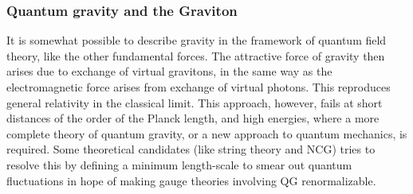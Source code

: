 \subsubsection{Quantum gravity and the Graviton}
It is somewhat possible to describe gravity in the framework of quantum field theory, like the other fundamental forces. The attractive force of gravity then arises due to exchange of virtual gravitons, in the same way as the electromagnetic force arises from exchange of virtual photons. This reproduces general relativity in the classical limit. This approach, however, fails at short distances of the order of the Planck length, and high energies, where a more complete theory of quantum gravity, or a new approach to quantum mechanics, is required. Some theoretical candidates (like string theory and NCG) tries to resolve this by defining a minimum length-scale to smear out quantum fluctuations in hope of making gauge theories involving QG renormalizable.
